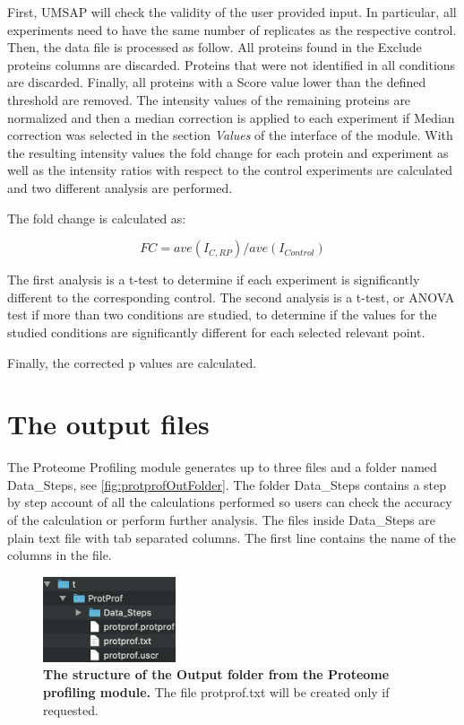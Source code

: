 First, UMSAP will check the validity of the user provided input. In particular, all experiments need to have the same number of replicates as the respective control. Then, the data file is processed as follow. All proteins found in the Exclude proteins columns are discarded. Proteins that were not identified in all conditions are discarded. Finally, all proteins with a Score value lower than the defined threshold are removed. The intensity values of the remaining proteins are normalized and then a median correction is applied to each experiment if Median correction was selected in the section \textit{Values} of the interface of the module. With the resulting intensity values the fold change for each protein and experiment as well as the intensity ratios with respect to the control experiments are calculated and two different analysis are performed.

The fold change is calculated as: 

\begin{equation}
\label{eq:protprofFC}
FC = ave(I_{C, RP}) / ave(I_{Control})
\end{equation}

The first analysis is a t-test to determine if each experiment is significantly different to the corresponding control. The second analysis is a t-test, or ANOVA test if more than two conditions are studied, to determine if the values for the studied conditions are significantly different for each selected relevant point.

Finally, the corrected p values are calculated.

\section{The output files}

The Proteome Profiling module generates up to three files and a folder named Data\_Steps, see \autoref{fig:protprofOutFolder}. The folder Data\_Steps contains a step by step account of all the calculations performed so users can check the accuracy of the calculation or perform further analysis. The files inside Data\_Steps are plain text file with tab separated columns. The first line contains the name of the columns in the file.  

\begin{figure}[h]
	\centering
	\includegraphics[width=0.35\textwidth]{./IMAGES/MOD-PROTPROF/protprof-files.jpg}	    
	\caption[The structure of the Output folder from the Proteome Profiling module]{\textbf{The structure of the Output folder from the Proteome profiling module.} The file protprof.txt will be created only if requested.} 
	\label{fig:protprofOutFolder}
	\vspace{-5pt} 	
\end{figure}


